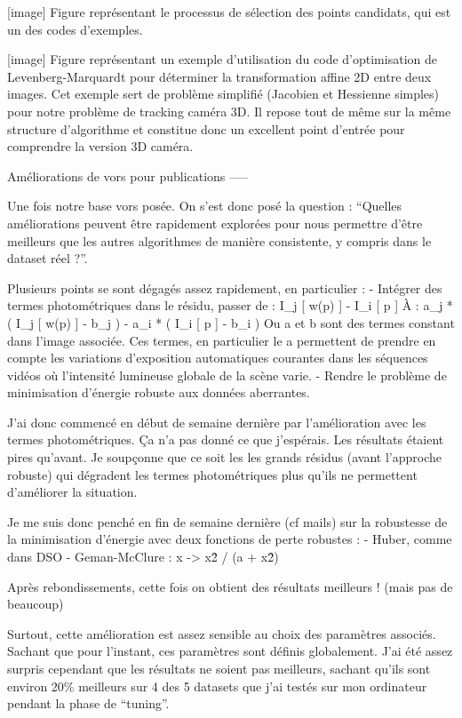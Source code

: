 [image] Figure représentant le processus de sélection des points candidats, qui est un des codes d’exemples.

[image] Figure représentant un exemple d’utilisation du code d’optimisation de Levenberg-Marquardt pour déterminer la transformation affine 2D entre deux images. Cet exemple sert de problème simplifié (Jacobien et Hessienne simples) pour notre problème de tracking caméra 3D. Il repose tout de même sur la même structure d’algorithme et constitue donc un excellent point d’entrée pour comprendre la version 3D caméra.

Améliorations de vors pour publications
-----

Une fois notre base vors posée. On s’est donc posé la question : “Quelles améliorations peuvent être rapidement explorées pour nous permettre d’être meilleurs que les autres algorithmes de manière consistente, y compris dans le dataset réel ?”.

Plusieurs points se sont dégagés assez rapidement, en particulier :
- Intégrer des termes photométriques dans le résidu, passer de : I\_j [ w(p) ] - I\_i [ p ]
À : a\_j * ( I\_j [ w(p) ] - b\_j )  -  a\_i * ( I\_i [ p ] - b\_i )
Ou a et b sont des termes constant dans l’image associée. Ces termes, en particulier le a permettent de prendre en compte les variations d’exposition automatiques courantes dans les séquences vidéos où l’intensité lumineuse globale de la scène varie.
- Rendre le problème de minimisation d’énergie robuste aux données aberrantes.

J’ai donc commencé en début de semaine dernière par l’amélioration avec les termes photométriques. Ça n’a pas donné ce que j’espérais. Les résultats étaient pires qu’avant. Je soupçonne que ce soit les les grands résidus (avant l’approche robuste) qui dégradent les termes photométriques plus qu’ils ne permettent d’améliorer la situation.

Je me suis donc penché en fin de semaine dernière (cf mails) sur la robustesse de la minimisation d’énergie avec deux fonctions de perte robustes :
- Huber, comme dans DSO
- Geman-McClure : x -> x\^2 / (a + x\^2)

Après rebondissements, cette fois on obtient des résultats meilleurs ! (mais pas de beaucoup)

Surtout, cette amélioration est assez sensible au choix des paramètres associés. Sachant que pour l’instant, ces paramètres sont définis globalement. J’ai été assez surpris cependant que les résultats ne soient pas meilleurs, sachant qu’ils sont environ 20\% meilleurs sur 4 des 5 datasets que j’ai testés sur mon ordinateur pendant la phase de “tuning”.

